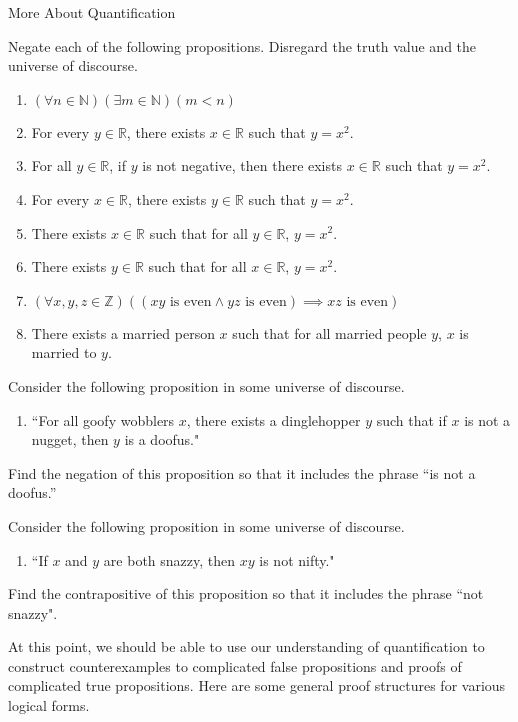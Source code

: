 \begin{section}{More About Quantification}
\begin{problem}
Negate each of the following propositions.  Disregard the truth value and the universe of discourse.
\begin{enumerate}[label=\textrm{(\alph*)}]
\item $(\forall n\in\mathbb{N})(\exists m\in\mathbb{N})(m<n)$
\item For every $y\in \mathbb{R}$, there exists $x\in \mathbb{R}$ such that $y=x^2$.
\item For all $y\in \mathbb{R}$, if $y$ is not negative, then there exists $x\in\mathbb{R}$ such that $y=x^2$.
\item For every $x\in \mathbb{R}$, there exists $y\in \mathbb{R}$ such that $y=x^2$.
\item There exists $x\in \mathbb{R}$ such that for all $y\in \mathbb{R}$, $y=x^2$.
\item There exists $y\in \mathbb{R}$ such that for all $x\in \mathbb{R}$, $y=x^2$.
\item $(\forall x,y,z\in\mathbb{Z})((xy \mbox{ is even}\wedge yz\mbox{ is even})\implies xz\mbox{ is even})$
\item There exists a married person $x$ such that for all married people $y$, $x$ is married to $y$.
\end{enumerate}
\end{problem}

\begin{problem}
Consider the following proposition in some universe of discourse.
\begin{enumerate}
\item[] ``For all goofy wobblers $x$, there exists a dinglehopper $y$ such that if $x$ is not a nugget, then $y$ is a doofus."
\end{enumerate}
Find the negation of this proposition so that it includes the phrase ``is not a doofus.''
\end{problem}

\begin{problem}
Consider the following proposition in some universe of discourse.
\begin{enumerate}
\item[] ``If $x$ and $y$ are both snazzy, then $xy$ is not nifty."
\end{enumerate}
Find the contrapositive of this proposition so that it includes the phrase ``not snazzy".

\end{problem}

At this point, we should be able to use our understanding of quantification to construct counterexamples to complicated false propositions and proofs of complicated true propositions.  Here are some general proof structures for various logical forms.


\end{section}
